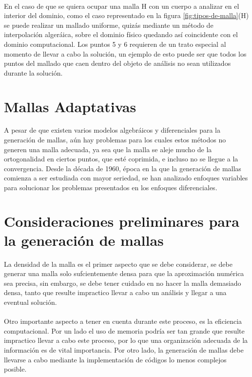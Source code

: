 \documentclass[letterpaper, openright, 12pt]{book}
\begin{document}
			\paragraph*{}
			En el caso de que se quiera ocupar una malla H con un cuerpo a analizar en el interior del dominio, como el caso representado en la figura \ref*{fig:tipos-de-malla}(H) se puede realizar un mallado uniforme, quizás mediante un método de interpolación algeráica, sobre el dominio físico quedando así coincidente con el dominio computacional. Los puntos 5 y 6 requieren de un trato especial al momento de llevar a cabo la solución, un ejemplo de esto puede ser que todos los puntos del mallado que caen dentro del objeto de análisis no sean utilizados durante la solución.
			
	\section{Mallas Adaptativas}
		\paragraph*{}
			A pesar de que existen varios modelos algebráicos y diferenciales para la generación de mallas, aún hay problemas para los cuales estos métodos no generen una malla adecuada, ya sea que la malla se aleje mucho de la ortogonalidad en ciertos puntos, que esté coprimida, e incluso no se llegue a la convergencia. Desde la década de 1960, época en la que la generación de mallas comienza a ser estudiada con mayor seriedad, se han analizado enfoques variables para solucionar los problemas presentados en los enfoques diferenciales.

	\section{Consideraciones preliminares para la generación de mallas}	
		\paragraph*{}
			La densidad de la malla es el primer aspecto que se debe considerar, se debe generar una malla solo sufcientemente densa para que la aproximación numérica sea precisa, sin embargo, se debe tener cuidado en no hacer la malla demasiado densa, tanto que resulte impractico llevar a cabo un análisis y llegar a una eventual solución.
		\paragraph{}
			 Otro importante aspecto a tener en cuenta durante este proceso, es la eficiencia computacional. Por un lado el uso de memoria podría ser tan grande que resulte impractico llevar a cabo este proceso, por lo que una organización adecuada de la información es de vital importancia. Por otro lado, la generación de mallas debe llevarse a cabo mediante la implementación de códigos lo menos complejos posible.
			
\end{document}
